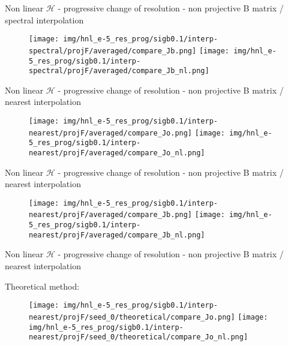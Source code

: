 \documentclass[francais]{beamer}
\begin{document}
\begin{frame}{Non linear $\mathcal{H}$ - progressive change of resolution - non projective B matrix / spectral interpolation}
\begin{center}
\begin{figure}
  \texttt{[image: img/hnl\_e-5\_res\_prog/sigb0.1/interp-spectral/projF/averaged/compare\_Jb.png]}
\endminipage\hfill
{}
  \texttt{[image: img/hnl\_e-5\_res\_prog/sigb0.1/interp-spectral/projF/averaged/compare\_Jb\_nl.png]}
\endminipage
\end{figure}
\end{center}
\end{frame}

\begin{frame}{Non linear $\mathcal{H}$ - progressive change of resolution - non projective B matrix / nearest interpolation}
\begin{center}
\begin{figure}
  \texttt{[image: img/hnl\_e-5\_res\_prog/sigb0.1/interp-nearest/projF/averaged/compare\_Jo.png]}
\endminipage\hfill
{}
  \texttt{[image: img/hnl\_e-5\_res\_prog/sigb0.1/interp-nearest/projF/averaged/compare\_Jo\_nl.png]}
\endminipage
\end{figure}
\end{center}
\end{frame}

\begin{frame}{Non linear $\mathcal{H}$ - progressive change of resolution - non projective B matrix / nearest interpolation}
\begin{center}
\begin{figure}
  \texttt{[image: img/hnl\_e-5\_res\_prog/sigb0.1/interp-nearest/projF/averaged/compare\_Jb.png]}
\endminipage\hfill
{}
  \texttt{[image: img/hnl\_e-5\_res\_prog/sigb0.1/interp-nearest/projF/averaged/compare\_Jb\_nl.png]}
\endminipage
\end{figure}
\end{center}
\end{frame}

\begin{frame}{Non linear $\mathcal{H}$ - progressive change of resolution - non projective B matrix / nearest interpolation}
\begin{center}
Theoretical method:
\begin{figure}
  \texttt{[image: img/hnl\_e-5\_res\_prog/sigb0.1/interp-nearest/projF/seed\_0/theoretical/compare\_Jo.png]}
\endminipage\hfill
{}
  \texttt{[image: img/hnl\_e-5\_res\_prog/sigb0.1/interp-nearest/projF/seed\_0/theoretical/compare\_Jo\_nl.png]}
\endminipage
\end{figure}
\end{center}
\end{frame}
\end{document}
